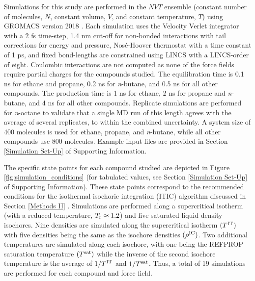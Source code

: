 \documentclass[preprint,letterpaper,floatfix,citeautoscript,aip,jcp]{revtex4-1}
\begin{document}
Simulations for this study are performed in the $NVT$ ensemble (constant number of molecules, $N$, constant volume, $V$, and constant temperature, $T$) using GROMACS version 2018 \cite{GROMACS_2018}. Each simulation uses the Velocity Verlet integrator with a 2 fs time-step, 1.4 nm cut-off for non-bonded interactions with tail corrections for energy and pressure, Nos{\'e}-Hoover thermostat with a time constant of 1 ps, and fixed bond-lengths are constrained using LINCS with a LINCS-order of eight. Coulombic interactions are not computed as none of the force fields require partial charges for the compounds studied. The equilibration time is 0.1 ns for ethane and propane, 0.2 ns for \textit{n}-butane, and 0.5 ns for all other compounds. The production time is 1 ns for ethane, 2 ns for propane and \textit{n}-butane, and 4 ns for all other compounds. Replicate simulations are performed for \textit{n}-octane to validate that a single MD run of this length agrees with the average of several replicates, to within the combined uncertainty. A system size of 400 molecules is used for ethane, propane, and \textit{n}-butane, while all other compounds use 800 molecules. Example input files are provided in Section \ref{Simulation Set-Up} of Supporting Information.

The specific state points for each compound studied are depicted in Figure \ref{fig:simulation_conditions} (for tabulated values, see Section \ref{Simulation Set-Up} of Supporting Information). 
These state points correspond to the recommended conditions for the isothermal isochoric integration (ITIC) algorithm discussed in Section \ref{Methods II} \cite{Mostafa_Diss,Postdoc_1,Mostafa2018}. 
Simulations are performed along a supercritical isotherm (with a reduced temperature, $T_{\rm r} \approx 1.2$) and five saturated liquid density isochores. Nine densities are simulated along the supercritical isotherm $(T^{\rm IT})$ with five densities being the same as the isochore densities $(\rho^{\rm IC})$. Two additional temperatures are simulated along each isochore, with one being the REFPROP saturation temperature $(T^{\rm sat})$ while the inverse of the second isochore temperature is the average of $1/T^{\rm IT}$ and $1/T^{\rm sat}$. Thus, a total of 19 simulations are performed for each compound and force field.
\end{document}
